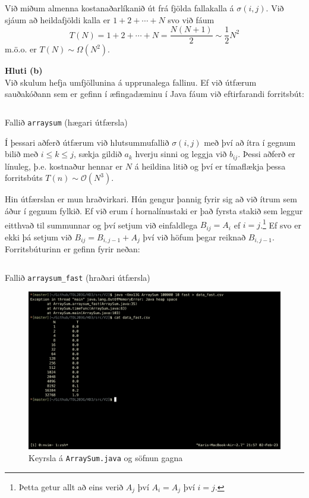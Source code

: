 \documentclass[12pt, a4paper, hidelinks]{article}
\begin{document}
\noindent
Við miðum almenna kostanaðarlíkanið út frá fjölda fallakalla á $\sigma(i, j)$. Við sjáum
að heildafjöldi kalla er $1 + 2 + \cdots + N$ svo við fáum
\[
    T(N) = 1 + 2 + \cdots + N = \frac{N(N + 1)}{2} \sim \frac 12 N^2
\]
m.ö.o. er $T(N) \sim \Omega(N^2)$.

\newpage
\noindent
\textbf{Hluti (b)} \medskip \\
Við skulum hefja umfjöllunina á upprunalega fallinu. Ef við útfærum sauðakóðann
sem er gefinn í æfingadæminu í Java fáum við eftirfarandi forritsbút:

\begin{listing}[ht!]
    \centering
    \inputminted[firstline=13, lastline=22, linenos]{java}{../src/V2/ArraySum.java}
    \caption{Fallið \texttt{arraysum} (hægari útfærsla)}
    \label{forrit2}
\end{listing}

\noindent
Í þessari aðferð útfærum við hlutsummufallið $\sigma(i, j)$ með því að ítra í gegnum bilið
með $i \leq k \leq j$, sækja gildið $a_k$ hverju sinni og leggja við $b_{ij}$. Þessi aðferð
er línuleg, þ.e. kostnaður hennar er $N$ á heildina litið og því er tímaflækja þessa forritsbúts
$T(n) \sim \mathcal O(N^3)$.

Hin útfærslan er mun hraðvirkari. Hún gengur þannig fyrir sig að við ítrum sem áður í gegnum fylkið.
Ef við erum í hornalínustaki er það fyrsta stakið sem leggur eitthvað til summunnar og því setjum við
einfaldlega $B_{ij} = A_i$ ef $i = j$.\footnote{Þetta getur allt að eins verið $A_j$ því $A_i = A_j$ því $i = j$.} 
Ef svo er ekki þá setjum við $B_{ij} = B_{i, j-1} + A_j$ því við höfum þegar reiknað $B_{i, j-1}$. Forritsbúturinn er gefinn fyrir neðan:

\begin{listing}[ht!]
    \centering 
    \inputminted[firstline=31, lastline=39, linenos]{java}{../src/V2/ArraySum.java}
    \caption{Fallið \texttt{arraysum\_fast} (hraðari útfærsla)}
    \label{forrit3}
\end{listing}

\begin{figure}[ht!]
    \centering
    \includegraphics[width=\textwidth]{img/arraysum_keyrsla.png}
    \caption{Keyrsla á \texttt{ArraySum.java} og söfnun gagna}
    \label{mynd2}
\end{figure}
\end{document}
